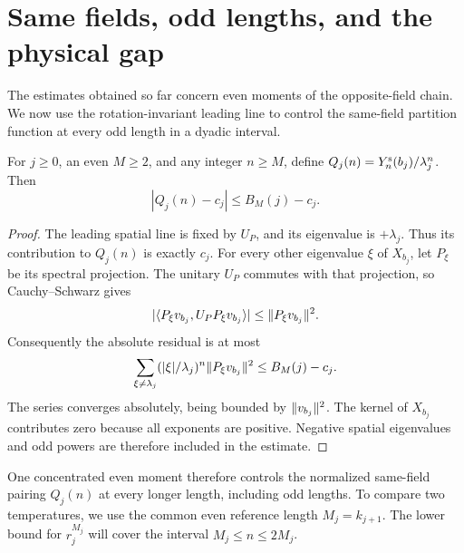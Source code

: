 \section{Same fields, odd lengths, and the physical gap}\label{sec:conclusion}
The estimates obtained so far concern even moments of the opposite-field
chain. We now use the rotation-invariant leading line to control the
same-field partition function at every odd length in a dyadic interval.

\begin{lemma}\label{co:signed}
For $j\ge0$, an even $M\ge2$, and any integer $n\ge M$, define
$Q_j(n)=Y_n^{\rm s}(b_j)/\lambda_j^n$. Then
\begin{equation}\label{co:error}
 |Q_j(n)-c_j|\le B_M(j)-c_j.
\end{equation}
\end{lemma}
\begin{proof}
The leading spatial line is fixed by $U_P$, and its eigenvalue is
$+\lambda_j$. Thus its contribution to $Q_j(n)$ is exactly $c_j$.
For every other eigenvalue $\xi$ of $X_{b_j}$, let $P_\xi$ be its
spectral projection. The unitary $U_P$ commutes with that projection,
so Cauchy--Schwarz gives
\[
 |\langle P_\xi v_{b_j},U_P P_\xi v_{b_j}\rangle|
 \le\lVert P_\xi v_{b_j}\rVert^2.
\]
Consequently the absolute residual is at most
\[
 \sum_{\xi\ne\lambda_j}
       (|\xi|/\lambda_j)^n\lVert P_\xi v_{b_j}\rVert^2
 \le B_M(j)-c_j.
\]
The series converges absolutely, being bounded by $\lVert v_{b_j}\rVert^2$.
The kernel of $X_{b_j}$ contributes zero because all exponents are
positive. Negative spatial eigenvalues and odd powers are therefore
included in the estimate.
\end{proof}

One concentrated even moment therefore controls the normalized same-field
pairing $Q_j(n)$ at every longer length, including odd lengths. To compare
two temperatures, we use the common even reference length $M_j=k_{j+1}$.
The lower bound for $r_j^{M_j}$ will cover the interval $M_j\le n\le2M_j$.

